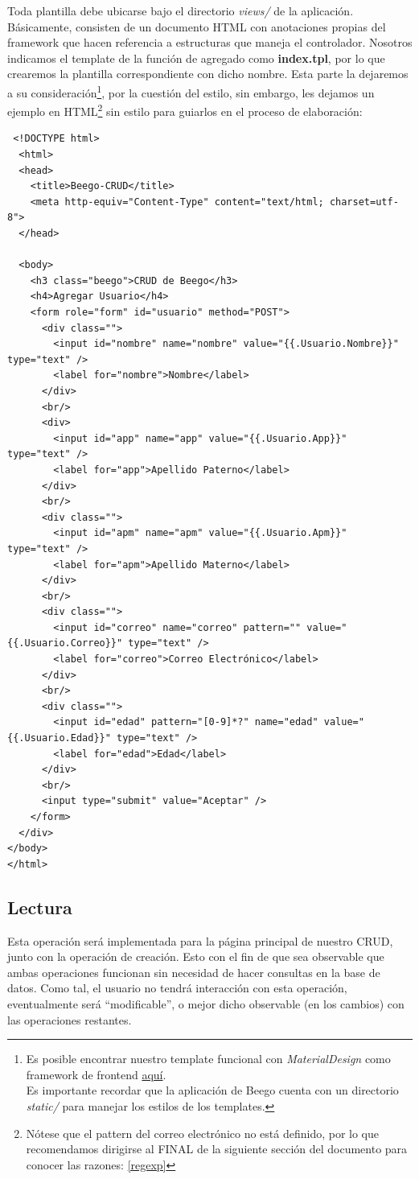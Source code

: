 \documentclass[12pt]{article}
\begin{document}
Toda plantilla debe ubicarse bajo el directorio \textit{views/} de la aplicación.
Básicamente, consisten de un documento HTML con anotaciones propias del framework
que hacen referencia a estructuras que maneja el controlador.
Nosotros indicamos el template de la función de agregado como \textbf{index.tpl},
por lo que crearemos la plantilla correspondiente con dicho nombre.
Esta parte la dejaremos a su consideración\footnote{Es posible encontrar nuestro
  template funcional con \textit{MaterialDesign} como framework de frontend
  \href{https://github.com/Kihui/Beego-CRUD/blob/master/views/index.tpl}{aquí}.\\
  Es importante recordar que la aplicación de Beego cuenta con un directorio \textit{static/}
para manejar los estilos de los templates.},
por la cuestión del estilo,
sin embargo, les dejamos un ejemplo en HTML\footnote{Nótese que el pattern del correo
  electrónico no está definido, por lo que recomendamos dirigirse al FINAL de la siguiente
  sección del documento para conocer las razones: \ref{regexp}}
sin estilo para guiarlos en el proceso de elaboración:
\begin{verbatim}
 <!DOCTYPE html>
  <html>
  <head>
    <title>Beego-CRUD</title>
    <meta http-equiv="Content-Type" content="text/html; charset=utf-8">
  </head>

  <body>
    <h3 class="beego">CRUD de Beego</h3>
    <h4>Agregar Usuario</h4>
    <form role="form" id="usuario" method="POST">
      <div class="">
        <input id="nombre" name="nombre" value="{{.Usuario.Nombre}}" type="text" />
        <label for="nombre">Nombre</label>
      </div>
      <br/>
      <div>
        <input id="app" name="app" value="{{.Usuario.App}}" type="text" />
        <label for="app">Apellido Paterno</label>
      </div>
      <br/>
      <div class="">
        <input id="apm" name="apm" value="{{.Usuario.Apm}}" type="text" />
        <label for="apm">Apellido Materno</label>
      </div>
      <br/>
      <div class="">
        <input id="correo" name="correo" pattern="" value="{{.Usuario.Correo}}" type="text" />
        <label for="correo">Correo Electrónico</label>
      </div>
      <br/>
      <div class="">
        <input id="edad" pattern="[0-9]*?" name="edad" value="{{.Usuario.Edad}}" type="text" />
        <label for="edad">Edad</label>
      </div>
      <br/>
      <input type="submit" value="Aceptar" />
    </form>
  </div>
</body>
</html>

\end{verbatim}
\subsection{Lectura}
Esta operación será implementada para la página principal de nuestro CRUD,
junto con la operación de creación. Esto con el fin de que sea observable
que ambas operaciones funcionan sin necesidad de hacer consultas en la base de
datos. Como tal, el usuario no tendrá interacción con esta operación, eventualmente
será ``modificable'', o mejor dicho observable (en los cambios) con las
operaciones restantes.\\
\end{document}
